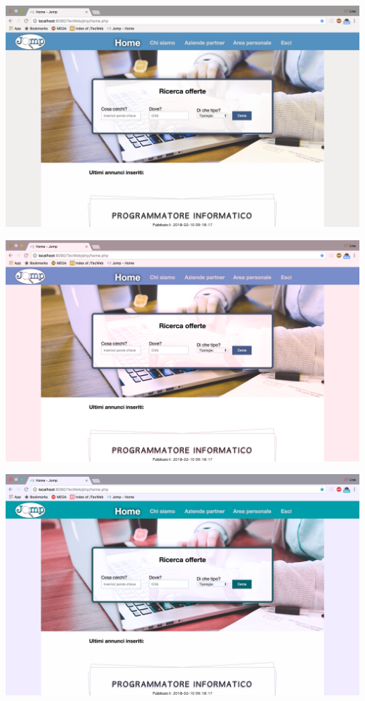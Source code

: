 	\centerline{\includegraphics[scale=0.12]{Images/protanopia.jpg}} 
	\vspace{15pt}
	\centerline{\includegraphics[scale=0.12]{Images/deuteranopia.jpg}}
	\vspace{15pt}
	\centerline{\includegraphics[scale=0.12]{Images/tritanopia.jpg}} 


